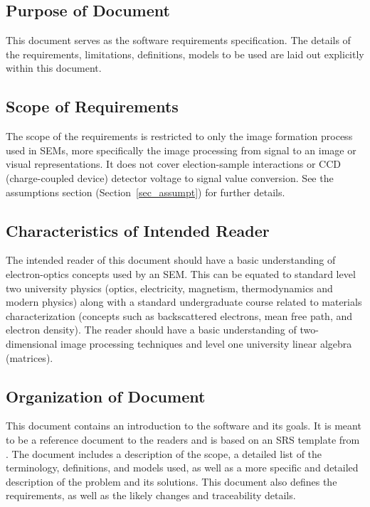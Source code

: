 \documentclass[12pt]{article}
\begin{document}
\subsection{Purpose of Document}

This document serves as the software requirements specification. The details of the 
requirements, limitations, definitions, models to be used are laid out explicitly 
within this document.

\subsection{Scope of Requirements} 

The scope of the requirements is restricted to only the image 
formation process used in SEMs, more specifically the image processing from 
signal to an image or visual representations. It does not cover election-sample 
interactions or CCD (charge-coupled device) detector voltage to signal value 
conversion. See the assumptions section (Section~\ref{sec_assumpt}) for further 
details.

\subsection{Characteristics of Intended Reader} \label{sec_IntendedReader}

The intended reader of this document should have a basic understanding of 
electron-optics concepts used by an SEM. This can be equated to standard level 
two university physics (optics, electricity, magnetism, thermodynamics and 
modern physics) along with a standard undergraduate course related to materials 
characterization (concepts such as backscattered electrons, mean free path, and 
electron density). The reader should have a basic understanding of two-dimensional 
image processing techniques and level one university linear algebra (matrices).

\subsection{Organization of Document}

This document contains an introduction to the software and its goals. It is 
meant to be a reference document to the readers and is based on an SRS template from \citet{SmithAndLai2005, SmithEtAl2007}. The document includes a 
description of the scope, a detailed list of the terminology, definitions, and 
models used, as well as a more specific and detailed description of the problem 
and its solutions. This document also defines the requirements, as well as the  
likely changes and traceability details.
\end{document}
